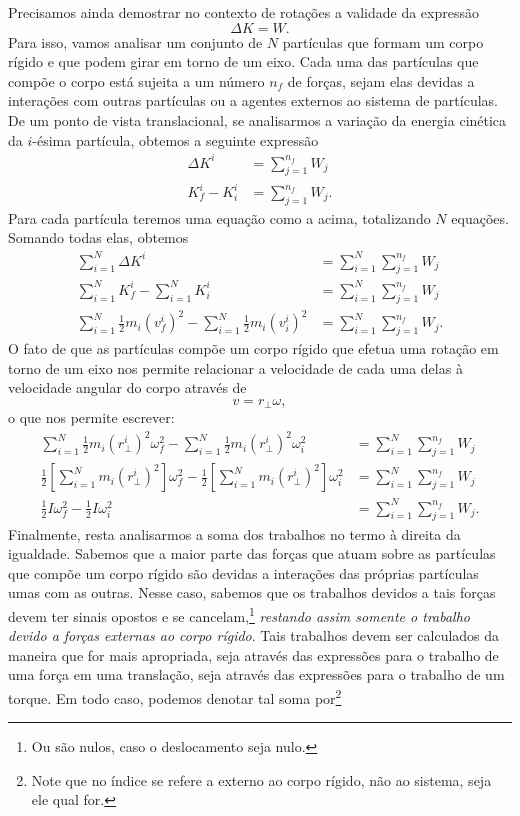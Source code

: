 Precisamos ainda demostrar no contexto de rotações a validade da expressão
\begin{equation}
    \Delta K = W.
\end{equation}
%
Para isso, vamos analisar um conjunto de $N$ partículas que formam um corpo rígido e que podem girar em torno de um eixo. Cada uma das partículas que compõe o corpo está sujeita a um número $n_f$ de forças, sejam elas devidas a interações com outras partículas ou a agentes externos ao sistema de partículas. De um ponto de vista translacional, se analisarmos a variação da energia cinética da $i$-ésima partícula, obtemos a seguinte expressão
\begin{align}
    \Delta K^i &= \sum_{j=1}^{n_f} W_j \\
    K_f^i - K_i^i &= \sum_{j=1}^{n_f} W_j.
\end{align}
%
Para cada partícula teremos uma equação como a acima, totalizando $N$ equações. Somando todas elas, obtemos
\begin{align}
    \sum_{i = 1}^N \Delta K^i &= \sum_{i = 1}^N\sum_{j=1}^{n_f} W_j \\
    \sum_{i = 1}^N K_f^i - \sum_{i = 1}^N K_i^i &= \sum_{i = 1}^N\sum_{j=1}^{n_f} W_j \\
    \sum_{i = 1}^N \frac{1}{2}m_i (v_f^i)^2 - \sum_{i = 1}^N \frac{1}{2}m_i(v_i^i)^2 &= \sum_{i = 1}^N\sum_{j=1}^{n_f} W_j.
\end{align}
%
O fato de que as partículas compõe um corpo rígido que efetua uma rotação em torno de um eixo nos permite relacionar a velocidade de cada uma delas à velocidade angular do corpo através de
\begin{equation*}
v = r_\perp \omega,
\end{equation*}
%
o que nos permite escrever:
\begin{align}
    \sum_{i = 1}^N \frac{1}{2}m_i (r_\perp^i)^2 \omega_f^2 - \sum_{i = 1}^N \frac{1}{2}m_i (r_\perp^i)^2\omega_i^2 &= \sum_{i = 1}^N\sum_{j=1}^{n_f} W_j \\
    \frac{1}{2}\left[\sum_{i = 1}^N m_i (r_\perp^i)^2\right]\omega_f^2 - \frac{1}{2}\left[\sum_{i = 1}^N m_i (r_\perp^i)^2\right]\omega_i^2 &= \sum_{i = 1}^N\sum_{j=1}^{n_f} W_j \\
    \frac{1}{2}I\omega_f^2 - \frac{1}{2}I\omega_i^2 &= \sum_{i = 1}^N\sum_{j=1}^{n_f} W_j.\label{Eq:TeoremaTrabalhoEnergiaRotQuaseFinal}
\end{align}
%
Finalmente, resta analisarmos a soma dos trabalhos no termo à direita da igualdade. Sabemos que a maior parte das forças que atuam sobre as partículas que compõe um corpo rígido são devidas a interações das próprias partículas umas com as outras. Nesse caso, sabemos que os trabalhos devidos a tais forças devem ter sinais opostos e se cancelam,\footnote{Ou são nulos, caso o deslocamento seja nulo.} \emph{restando assim somente o trabalho devido a forças externas ao corpo rígido}. Tais trabalhos devem ser calculados da maneira que for mais apropriada, seja através das expressões para o trabalho de uma força em uma translação, seja através das expressões para o trabalho de um torque. Em todo caso, podemos denotar tal soma por\footnote{Note que no índice se refere a externo ao corpo rígido, não ao sistema, seja ele qual for.}
